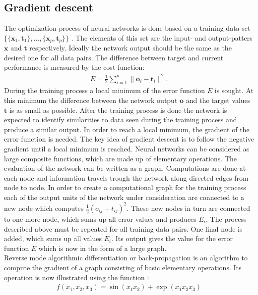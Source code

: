 \subsection{Gradient descent}
The optimization process of neural networks is done based on a training data set $\{\{\mathbf{x}_1,\mathbf{t}_1\}, \dots , \{\mathbf{x}_p,\mathbf{t}_p\} \}$ \cite[page 156]{Rojas1996}. The elements of this set are the input- and output-patters $\mathbf{x}$ and $\mathbf{t}$ respectively. Ideally the network output should be the same as the desired one for all data pairs. The difference between target and current performance is measured by the cost function\cite[page 156]{Rojas1996}:
\begin{align}
E = \frac{1}{2}\sum\limits_{i=1}^{p} \| \mathbf{o}_i - \mathbf{t}_i \|^2.
\end{align}
During the training process a local minimum of the error function $E$ is sought. At this minimum the difference between the network output $\mathbf{o}$ and the target values $\mathbf{t}$ is as small as possible. After the training process is done the network is expected to identify similarities to data seen during the training process and produce a similar output. 
In order to reach a local minimum, the gradient of the error function is needed. The key idea of gradient descent is to follow the negative gradient until a local minimum is reached. 
Neural networks can be considered as large composite functions, which are made up of elementary operations. The evaluation of the network can be written as a graph. Computations are done at each node and information travels trough the network along directed edges from node to node. In order to create a computational graph for the training process each of the output units of the network under consideration are connected to a new node which computes $\frac{1}{2}(o_{ij} - t_{ij})^2$\cite[page 157]{Rojas1996}. These new nodes in turn are connected to one more node, which sums up all error values and produces $E_i$. The process described above must be repeated for all training data pairs. One final node is added, which sums up all values $E_i$. Its output gives the value for the error function $E$ which is now in the form of a large graph.\\
Reverse mode algorithmic differentiation or back-propagation is an algorithm to compute the gradient of a graph consisting of basic elementary operations. Its operation is now illustrated using the function \cite[page 69]{Diehl2013}:
\begin{align}
f(x_1,x_2,x_3) = \sin(x_1 x_2) + \exp(x_1 x_2 x_3)
\label{eq:backFun}
\end{align}
